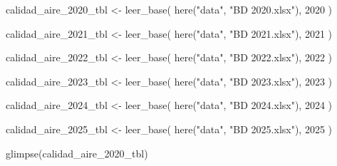 \documentclass[
  letterpaper,
  DIV=11,
  numbers=noendperiod]{scrartcl}
\newenvironment{Shaded}{\begin{snugshade}}{\end{snugshade}}
\newcommand{\DecValTok}[1]{\textcolor[rgb]{0.68,0.00,0.00}{#1}}
\newcommand{\FunctionTok}[1]{\textcolor[rgb]{0.28,0.35,0.67}{#1}}
\newcommand{\NormalTok}[1]{\textcolor[rgb]{0.00,0.23,0.31}{#1}}
\newcommand{\OtherTok}[1]{\textcolor[rgb]{0.00,0.23,0.31}{#1}}
\newcommand{\StringTok}[1]{\textcolor[rgb]{0.13,0.47,0.30}{#1}}
\begin{document}
\begin{Shaded}
\begin{Highlighting}[]
\NormalTok{calidad\_aire\_2020\_tbl }\OtherTok{\textless{}{-}} \FunctionTok{leer\_base}\NormalTok{(}
  \FunctionTok{here}\NormalTok{(}\StringTok{"data"}\NormalTok{, }\StringTok{"BD 2020.xlsx"}\NormalTok{),}
  \DecValTok{2020}
\NormalTok{)}

\NormalTok{calidad\_aire\_2021\_tbl }\OtherTok{\textless{}{-}} \FunctionTok{leer\_base}\NormalTok{(}
  \FunctionTok{here}\NormalTok{(}\StringTok{"data"}\NormalTok{, }\StringTok{"BD 2021.xlsx"}\NormalTok{),}
  \DecValTok{2021}
\NormalTok{)}

\NormalTok{calidad\_aire\_2022\_tbl }\OtherTok{\textless{}{-}} \FunctionTok{leer\_base}\NormalTok{(}
  \FunctionTok{here}\NormalTok{(}\StringTok{"data"}\NormalTok{, }\StringTok{"BD 2022.xlsx"}\NormalTok{),}
  \DecValTok{2022}
\NormalTok{)}

\NormalTok{calidad\_aire\_2023\_tbl }\OtherTok{\textless{}{-}} \FunctionTok{leer\_base}\NormalTok{(}
  \FunctionTok{here}\NormalTok{(}\StringTok{"data"}\NormalTok{, }\StringTok{"BD 2023.xlsx"}\NormalTok{),}
  \DecValTok{2023}
\NormalTok{)}

\NormalTok{calidad\_aire\_2024\_tbl }\OtherTok{\textless{}{-}} \FunctionTok{leer\_base}\NormalTok{(}
  \FunctionTok{here}\NormalTok{(}\StringTok{"data"}\NormalTok{, }\StringTok{"BD 2024.xlsx"}\NormalTok{),}
  \DecValTok{2024}
\NormalTok{)}

\NormalTok{calidad\_aire\_2025\_tbl }\OtherTok{\textless{}{-}} \FunctionTok{leer\_base}\NormalTok{(}
  \FunctionTok{here}\NormalTok{(}\StringTok{"data"}\NormalTok{, }\StringTok{"BD 2025.xlsx"}\NormalTok{),}
  \DecValTok{2025}
\NormalTok{)}


\FunctionTok{glimpse}\NormalTok{(calidad\_aire\_2020\_tbl)}
\end{Highlighting}
\end{Shaded}
\end{document}
